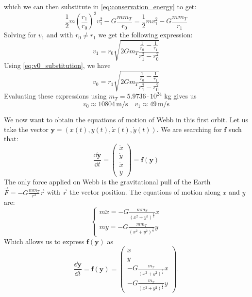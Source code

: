 which we can then substitute in \autoref{eq:conservation_energy} to get:
\begin{equation}
    \frac{1}{2} m \left(\frac{r_1}{r_0}\right)^2 v_1^2 - G \frac{m m_T}{r_0} = \frac{1}{2} m v_1^2 - G \frac{m m_T}{r_1}
\end{equation}
Solving for \(v_1\) and with $r_0 \neq r_1$ we get the following expression:
\begin{equation}
    v_1 = r_0 \sqrt{2 G m_T \frac{\frac{1}{r_0}-\frac{1}{r_1}}{r_1^2-r_0^2}}
\end{equation}
Using \autoref{eq:v0_substitution}, we have
\begin{equation}
    v_0 = r_1 \sqrt{2 G m_T \frac{\frac{1}{r_0}-\frac{1}{r_1}}{r_1^2-r_0^2}}
\end{equation}
Evaluating these expressions using \(m_T = 5.9736 \cdot 10^{24}\) kg gives us
\begin{equation}
    v_0 \approx 10804 \, \textrm{m/s} \quad v_1 \approx 49 \, \textrm{m/s}
\end{equation}

We now want to obtain the equations of motion of Webb in this first orbit. Let us take the vector \(\mathbf{y} = (x(t), y(t), \dot x(t), \dot y(t))\). We are searching for \(\mathbf{f}\) such that:
\begin{equation}
    \frac{\dd \mathbf{y}}{\dd t} = \left(\begin{matrix} \dot x \\ \dot y \\ \ddot x \\ \ddot y \end{matrix}\right) = \mathbf{f}(\mathbf{y})
\end{equation}
The only force applied on Webb is the gravitational pull of the Earth $\vec{F} = -G \frac{m m_T}{r^3}\vec{r}$ with $\vec{r}$ the vector position. The equations of motion along \(x\) and \(y\) are:
\begin{equation}
    \begin{cases}
        m \ddot x = -G \frac{m m_T}{\left(x^2+y^2\right)^\frac{3}{2}} x \\
        m \ddot y = -G \frac{m m_T}{\left(x^2+y^2\right)^\frac{3}{2}} y
    \end{cases}
\end{equation}
Which allows us to express \(\mathbf{f}(\mathbf{y})\) as
\begin{equation}
    \frac{\dd \mathbf{y}}{\dd t} = \mathbf{f}(\mathbf{y}) = \left(\begin{matrix} \dot x \\ \dot y \\ -G \frac{m_T}{\left(x^2+y^2\right)^\frac{3}{2}} x \\ -G \frac{m_T}{\left(x^2+y^2\right)^\frac{3}{2}} y \end{matrix}\right).
\end{equation}

